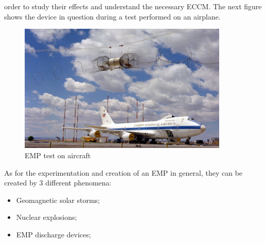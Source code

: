 \documentclass[12pt]{report}
\begin{document}
order to study their effects and understand the necessary ECCM. The next figure shows the device in question during a test performed on an airplane. 

\begin{figure}[h!]
    \centering
    \includegraphics[width=10cm]{Pictures/EMP test.jpg}
    \caption{EMP test on aircraft}
\end{figure}

As for the experimentation and creation of an EMP in general, they can be created by 3 different phenomena:

\begin{itemize}
     \item Geomagnetic solar storms;
         
    \item Nuclear explosions;
        
    \item EMP discharge devices;
\end{itemize}
\end{document}
